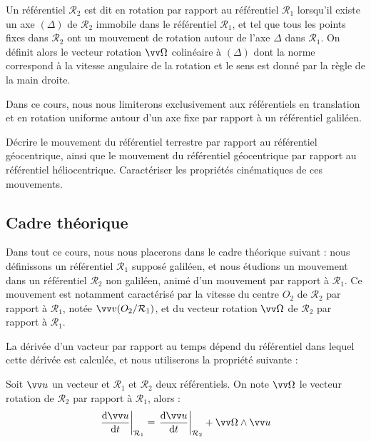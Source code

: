 \documentclass[11pt,fleqn]{book} %
\newcommand{\dd}{\mathrm{d}}
\newcommand{\rref}{\mathcal{R}}
\begin{document}
\begin{definition}[Rotation]
	Un référentiel $\rref_2$ est dit en rotation par rapport au référentiel $\rref_1$ lorsqu'il existe un axe $(\Delta)$ de $\rref_2$ immobile dans le référentiel $\rref_1$, et tel que tous les points fixes dans $\rref_2$ ont un mouvement de rotation autour de l'axe $\Delta$ dans $\rref_1$.
	On définit alors le vecteur rotation $\vv \Omega$ colinéaire à $(\Delta)$ dont la norme correspond à la vitesse angulaire de la rotation et le sens est donné par la règle de la main droite.
\end{definition}
\begin{remark}
	Dans ce cours, nous nous limiterons exclusivement aux référentiels en translation et en rotation uniforme autour d'un axe fixe par rapport à un référentiel galiléen.
\end{remark}

\begin{capex}
	Décrire le mouvement du référentiel terrestre par rapport au référentiel géocentrique, ainsi que le mouvement du référentiel géocentrique par rapport au référentiel héliocentrique. Caractériser les propriétés cinématiques de ces mouvements.
\end{capex}

\subsection{Cadre théorique}

Dans tout ce cours, nous nous placerons dans le cadre théorique suivant : nous définissons un référentiel $\rref_1$ supposé galiléen, et nous étudions un mouvement dans un référentiel $\rref_2$ non galiléen, animé d'un mouvement par rapport à $\rref_1$. Ce mouvement est notamment caractérisé par la vitesse du centre $O_2$ de $\rref_2$ par rapport à $\rref_1$, notée $\vv v(O_2/\rref_1)$, et du vecteur rotation $\vv \Omega$ de $\rref_2$ par rapport à $\rref_1$. 

La dérivée d'un vacteur par rapport au temps dépend du référentiel dans lequel cette dérivée est calculée, et nous utiliserons la propriété suivante :
\begin{theorem}
	Soit $\vv u$ un vecteur et $\rref_1$ et $\rref_2$ deux référentiels. On note $\vv \Omega$ le vecteur rotation de $\rref_2$ par rapport à $\rref_1$, alors :
	\begin{equation}
		\left. \frac{\dd \vv u}{\dd t} \right|_{\rref_1} = \left. \frac{\dd \vv u}{\dd t} \right|_{\rref_2} + \vv \Omega \wedge \vv u
	\end{equation}
\end{theorem}
\end{document}
